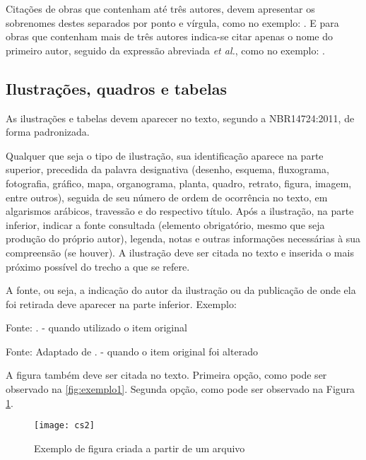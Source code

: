 Citações de obras que contenham até três autores, devem apresentar os sobrenomes destes separados por ponto e vírgula, como no exemplo: \cite[p. 2]{Pinto2000}. E para obras que contenham mais de três autores indica-se citar apenas o nome do primeiro autor, seguido da expressão abreviada \textit{et al.}, como no exemplo: \cite{Guimaraes2003}.

\subsection{Ilustrações, quadros e tabelas}\label{subsec:ilustracoes}

As ilustrações e tabelas devem aparecer no texto, segundo a NBR14724:2011, de forma padronizada.

Qualquer que seja o tipo de ilustração, sua identificação aparece na parte superior, precedida da palavra designativa (desenho, esquema, fluxograma, fotografia, gráfico, mapa, organograma, planta, quadro, retrato, figura, imagem, entre outros), seguida de seu número de ordem de ocorrência no texto, em algarismos arábicos, travessão e do respectivo título. Após a ilustração, na parte inferior, indicar a fonte consultada (elemento obrigatório, mesmo que seja produção do próprio autor), legenda, notas e outras informações necessárias à sua compreensão (se houver). A ilustração deve ser citada no texto e inserida o mais próximo possível do trecho a que se refere.

A fonte, ou seja, a indicação do autor da ilustração ou da publicação de onde ela foi retirada deve aparecer na parte inferior. Exemplo:

Fonte: . 			- quando utilizado o item original

Fonte: Adaptado de .	- quando o item original foi alterado

A figura também deve ser citada no texto. Primeira opção, como pode ser observado na \autoref{fig:exemplo1}. Segunda opção, como pode ser observado na Figura \ref{fig:exemplo1}.

\begin{figure}[htb]%
    \caption{Exemplo de figura criada a partir de um arquivo}%
    \label{fig:exemplo1}%
    \texttt{[image: cs2]}%
\end{figure}

